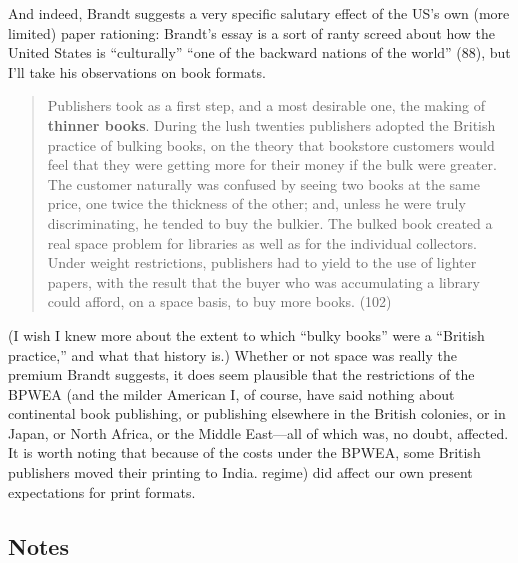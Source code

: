 \documentclass[
  12pt,
]{article}
\begin{document}
And indeed, Brandt suggests a very specific salutary effect of the US's
own (more limited) paper rationing: {Brandt's essay is a sort of ranty
screed about how the United States is ``culturally'' ``one of the
backward nations of the world'' (88), but I'll take his observations on
book formats.}

\begin{quote}
Publishers took as a first step, and a most desirable one, the making of
\textbf{thinner books}. During the lush twenties publishers adopted the
British practice of bulking books, on the theory that bookstore
customers would feel that they were getting more for their money if the
bulk were greater. The customer naturally was confused by seeing two
books at the same price, one twice the thickness of the other; and,
unless he were truly discriminating, he tended to buy the bulkier. The
bulked book created a real space problem for libraries as well as for
the individual collectors. Under weight restrictions, publishers had to
yield to the use of lighter papers, with the result that the buyer who
was accumulating a library could afford, on a space basis, to buy more
books. (102)
\end{quote}

(I wish I knew more about the extent to which ``bulky books'' were a
``British practice,'' and what that history is.) Whether or not space
was really the premium Brandt suggests, it does seem plausible that the
restrictions of the BPWEA (and the milder American {I, of course, have
said nothing about continental book publishing, or publishing elsewhere
in the British colonies, or in Japan, or North Africa, or the Middle
East---all of which was, no doubt, affected. It is worth noting that
because of the costs under the BPWEA, some British publishers moved
their printing to India.} regime) did affect our own present
expectations for print formats.

\hypertarget{notes}{%
\subsection{Notes}\label{notes}}
\end{document}
